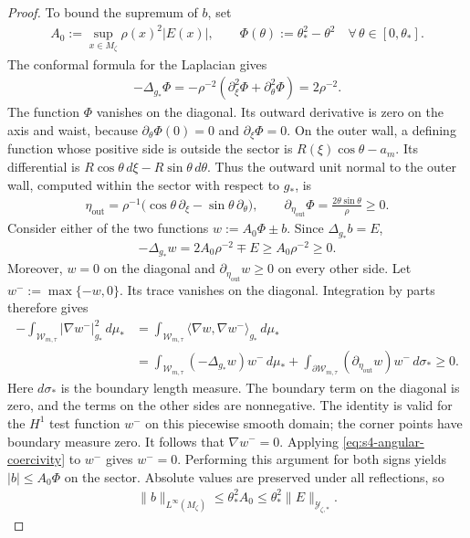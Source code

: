 \documentclass[a4paper,11pt,oneside,reqno]{amsart}
\numberwithin{equation}{section}
\theoremstyle{definition}
\begin{document}
\begin{proof}
    To bound the supremum of $b$, set
    \begin{align*}
        A_0:=\sup_{x\in M_\zeta}\rho(x)^2|E(x)|,
        \qquad
        \Phi(\theta):=\theta_*^2-\theta^2
        \quad\forall\,\theta\in[0,\theta_*].
    \end{align*}
    The conformal formula for the Laplacian gives
    \begin{align*}
        -\Delta_{g_*}\Phi
        =-\rho^{-2}(\partial_\xi^2\Phi
                         +\partial_\theta^2\Phi)
        =2\rho^{-2}.
    \end{align*}
    The function $\Phi$ vanishes on the diagonal.
    Its outward derivative is zero on the axis and
    waist, because $\partial_\theta\Phi(0)=0$ and
    $\partial_\xi\Phi=0$.
    On the outer wall, a defining function whose
    positive side is outside the sector is
    $R(\xi)\cos\theta-a_m$. Its differential is
    $R\cos\theta\,d\xi-R\sin\theta\,d\theta$.
    Thus the outward unit normal to the outer wall, computed within the sector with respect to $g_*$, is
    \begin{align*}
        \eta_{\mathrm{out}}
        =\rho^{-1}\bigl(\cos\theta\,\partial_\xi
                         -\sin\theta\,\partial_\theta\bigr),
        \qquad
        \partial_{\eta_{\mathrm{out}}}\Phi
        =\frac{2\theta\sin\theta}{\rho}\geq0.
    \end{align*}
    Consider either of the two functions
    $w:=A_0\Phi\pm b$. Since $\Delta_{g_*}b=E$,
    \begin{align*}
        -\Delta_{g_*}w
        =2A_0\rho^{-2}\mp E
        \geq A_0\rho^{-2}\geq0.
    \end{align*}
    Moreover, $w=0$ on the diagonal and
    $\partial_{\eta_{\mathrm{out}}}w\geq0$ on
    every other side. Let $w^-:=\max\{-w,0\}$.
    Its trace vanishes on the diagonal. Integration
    by parts therefore gives
    \begin{align*}
        -\int_{\mathcal W_{m,\tau}}|\nabla w^-|_{g_*}^2\,d\mu_*
        &=\int_{\mathcal W_{m,\tau}}\langle\nabla w,\nabla w^-\rangle_{g_*}\,d\mu_*\\
        &=\int_{\mathcal W_{m,\tau}}(-\Delta_{g_*}w)w^-\,d\mu_*+\int_{\partial\mathcal W_{m,\tau}}(\partial_{\eta_{\mathrm{out}}}w)w^-\,d\sigma_*\geq0.
    \end{align*}
    Here $d\sigma_*$ is the boundary length measure.
    The boundary term on the diagonal is zero, and
    the terms on the other sides are nonnegative.
    The identity is valid for the $H^1$ test function
    $w^-$ on this piecewise smooth domain; the corner
    points have boundary measure zero. It follows that
    $\nabla w^-=0$. Applying
    \eqref{eq:s4-angular-coercivity} to $w^-$ gives
    $w^-=0$. Performing this argument for both signs
    yields $|b|\leq A_0\Phi$ on the sector. Absolute
    values are preserved under all reflections, so
    \begin{align}
        \label{eq:s4-model-barrier}
        \|b\|_{L^\infty(M_\zeta)}
        \leq\theta_*^2 A_0
        \leq\theta_*^2\|E\|_{\mathcal Y_{\zeta,*}}.
    \end{align}


\end{proof}
\end{document}
